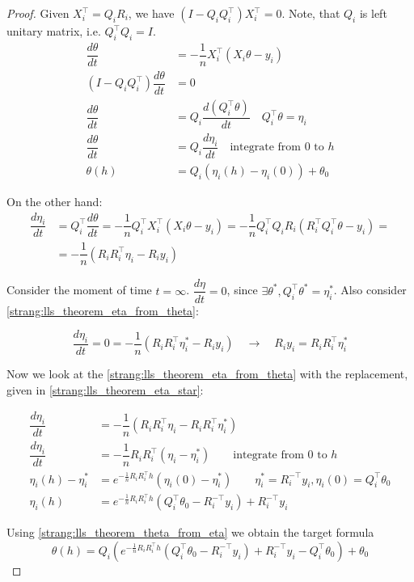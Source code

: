 \documentclass{article} %
\begin{document}
\begin{proof}
Given $X_i^\top = Q_i R_i$, we have $(I - Q_iQ_i^\top)X_i^\top = 0$. Note, that $Q_i$ is left unitary matrix, i.e. $Q_i^\top Q_i = I$. 
\begin{align}
\nonumber \dfrac{d \theta}{d t} &= - \dfrac{1}{n} X_i^\top( X_i \theta - y_i) \\
\nonumber (I - Q_iQ_i^\top)\dfrac{d \theta}{d t} &= 0 \\
\nonumber \dfrac{d \theta}{d t} &= Q_i\dfrac{d (Q_i^\top\theta)}{d t} \quad Q_i^\top \theta = \eta_i\\ 
\nonumber \dfrac{d \theta}{d t} &= Q_i\dfrac{d \eta_i}{d t} \quad \text{integrate from $0$ to $h$}\\ 
\label{strang:lls_theorem_theta_from_eta}\theta(h) &= Q_i \left(\eta_i(h) - \eta_i(0) \right) + \theta_0
\end{align}

On the other hand:
\begin{align}\nonumber
\dfrac{d \eta_i}{d t} &= Q_i^\top\dfrac{d \theta}{d t} =  - \dfrac{1}{n} Q_i^\top  X_i^\top( X_i \theta - y_i) = - \dfrac{1}{n} Q_i^\top  Q_i R_i( R_i^\top Q_i^\top \theta - y_i) =\\ 
&= - \dfrac{1}{n} \left( R_iR_i^\top \eta_i - R_i y_i\right) \label{strang:lls_theorem_eta_from_theta}
\end{align}

Consider the moment of time $t = \infty$. $\dfrac{d \eta}{d t} = 0$, since $\exists \theta^*, Q_i^\top \theta^* = \eta_i^*$. Also consider \ref{strang:lls_theorem_eta_from_theta}:

\begin{equation}\label{strang:lls_theorem_eta_star}
\dfrac{d \eta_i}{d t} = 0 = - \dfrac{1}{n} \left( R_iR_i^\top \eta_i^* - R_i y_i\right) \quad \rightarrow \quad R_i y_i = R_iR_i^\top \eta_i^*
\end{equation}

Now we look at the \ref{strang:lls_theorem_eta_from_theta} with the replacement, given in \ref{strang:lls_theorem_eta_star}:

\begin{align*}
\dfrac{d \eta_i}{d t} &= - \dfrac{1}{n} \left( R_iR_i^\top \eta_i- R_iR_i^\top \eta_i^*\right) \\
\dfrac{d \eta_i}{d t} &= - \dfrac{1}{n} R_iR_i^\top \left( \eta_i- \eta_i^*\right) \qquad \text{integrate from $0$ to $h$} \\
\eta_i(h) - \eta_i^* &= e^{- \frac{1}{n} R_iR_i^\top h} (\eta_i(0) - \eta_i^*) \qquad \eta_i^* = R_i^{-\top}y_i, \eta_i(0) = Q_i^\top \theta_0 \\ 
\eta_i(h) &= e^{- \frac{1}{n} R_iR_i^\top h} (Q_i^\top \theta_0 - R_i^{-\top}y_i) + R_i^{-\top}y_i 
\end{align*}

Using \ref{strang:lls_theorem_theta_from_eta} we obtain the target formula
$$
\theta(h) = Q_i \left(e^{- \frac{1}{n} R_iR_i^\top h} (Q_i^\top \theta_0 - R_i^{-\top}y_i) + R_i^{-\top}y_i - Q_i^\top \theta_0 \right) + \theta_0
$$

\end{proof}
\end{document}
